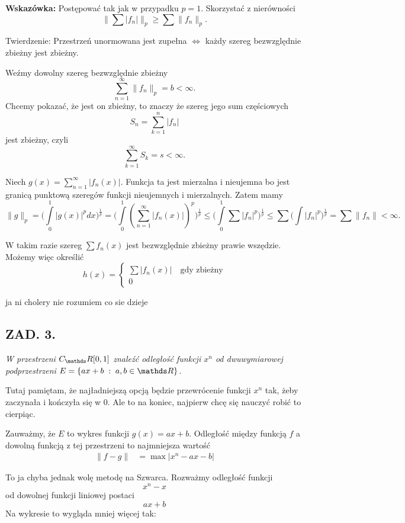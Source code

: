 \documentclass{article}
\begin{document}
\textbf{Wskazówka:} Postępować tak jak w przypadku $p=1$. Skorzystać z nierówności
$$\|\sum|f_n|\|_p\geq\sum\|f_n\|_p.$$

\medskip

{\color{def}Twierdzenie}: Przestrzeń unormowana jest zupełna $\iff$ każdy szereg bezwzględnie zbieżny jest zbieżny.
\medskip

Weźmy dowolny szereg bezwzględnie zbieżny
$$\sum\limits_{n=1}^\infty\|f_n\|_p=b<\infty.$$
Chcemy pokazać, że jest on zbieżny, to znaczy że szereg jego sum częściowych
$$S_n=\sum\limits_{k=1}^n |f_n|$$
jest zbieżny, czyli
$$\sum\limits_{k=1}^\infty S_k=s<\infty.$$

Niech $g(x)=\sum\limits_{n=1}^\infty|f_n(x)|$. Funkcja ta jest mierzalna i nieujemna bo jest granicą punktową szeregów funkcji nieujemnych i mierzalnych. Zatem mamy
$$\|g\|_p=\Big(\int\limits_0^1|g(x)|^pdx\Big)^{\frac1p}=\Big(\int\limits_0^1(\sum\limits_{n=1}^\infty|f_n(x)|)^p\Big)^\frac1p\leq \Big(\int\limits_0^1\sum|f_n|^p\Big)^\frac1p\leq\sum\Big(\int|f_n|^p\Big)^\frac1p=\sum\|f_n\|<\infty.$$

W takim razie szereg $\sum f_n(x)$ jest bezwzględnie zbieżny prawie wszędzie. Możemy więc określić
$$h(x)=\begin{cases}\sum|f_n(x)|\quad \text{gdy zbieżny}\\
0\end{cases}$$

{\color{cyan}ja ni cholery nie rozumiem co sie dzieje}

\subsection*{ZAD. 3.}
\emph{W przestrzeni $C_\R[0,1]$ znaleźć odległość funkcji $x^n$ od dwuwymiarowej podprzestrzeni $E=\{ax+b\;:\;a,b\in\R\}$.}
\medskip

Tutaj pamiętam, że najładniejszą opcją będzie przewrócenie funkcji $x^n$ tak, żeby zaczynała i kończyła się w 0. Ale to na koniec, najpierw chcę się nauczyć robić to cierpiąc.
\medskip

Zauważmy, że $E$ to wykres funkcji $g(x)=ax+b$. Odległość między funkcją $f$ a dowolną funkcją z tej przestrzeni to najmniejsza wartość
\begin{align*}
    \|f-g\|&=\max|x^n-ax-b|
\end{align*}

\smallskip

To ja chyba jednak wolę metodę na Szwarca. Rozważmy odległość funkcji
$$x^n-x$$
od dowolnej funkcji liniowej postaci
$$ax+b$$
Na wykresie to wygląda mniej więcej tak:
\end{document}
